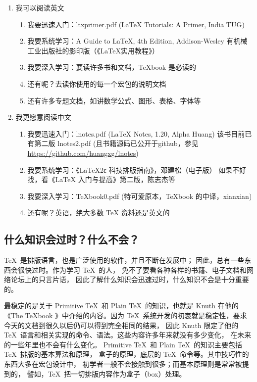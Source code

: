 \begin{enumerate}
\item 我可以阅读英文

\begin{enumerate}
\item 我要迅速入门：ltxprimer.pdf (LaTeX Tutorials: A Primer, India TUG)
\item 我要系统学习：A Guide to LaTeX, 4th Edition, Addison-Wesley
      有机械工业出版社的影印版（《LaTeX实用教程》）
\item 我要深入学习：要读许多书和文档，TeXbook 是必读的
\item 还有呢？去读你使用的每一个宏包的说明文档
\item 还有许多专题文档，如讲数学公式、图形、表格、字体等
\end{enumerate}

\item 我更愿意阅读中文
\begin{enumerate}
\item 我要迅速入门：lnotes.pdf (LaTeX Notes, 1.20, Alpha Huang)
 该书目前已有第二版 lnotes2.pdf (且书籍源码已公开于github，参见\url{https://github.com/huangxg/lnotes})
\item 我要系统学习：《LaTeX2ε 科技排版指南》，邓建松（电子版）
 如果不好找，看《LaTeX 入门与提高》第二版，陈志杰等
\item 我要深入学习：TeXbook0.pdf (特可爱原本，TeXbook 的中译，xianxian)
\item 还有呢？英语，绝大多数 TeX 资料还是英文的
\end{enumerate}
\end{enumerate}

\subsection{什么知识会过时？什么不会？}

\TeX\ 是排版语言，也是广泛使用的软件，并且不断在发展中；
因此，总有一些东西会很快过时。作为学习 \TeX\ 的人，
免不了要看各种各样的书籍、电子文档和网络论坛上的只言片语，
因此了解什么知识会迅速过时，什么知识不会是十分重要的。

最稳定的是关于 Primitive \TeX\ 和 Plain \TeX\ 的知识，也就是 Knuth
在他的《The TeXbook 》中介绍的内容。因为 \TeX\
系统开发的初衷就是稳定性，要求今天的文档到很久以后仍可以得到完全相同的结果，
因此 Knuth 限定了他的 \TeX\ 语言和相关实现的命令、语法。这些内容许多年来就没有多少变化，
在未来的一些年里也不会有什么变化。
Primitive \TeX\ 和 Plain \TeX\ 的知识主要包括 \TeX\ 排版的基本算法和原理，
盒子的原理，底层的 \TeX\ 命令等。其中技巧性的东西大多在宏包设计中，
初学者一般不会接触到很多；而基本原理则是常常被提到的，
譬如，\TeX\ 把一切排版内容作为盒子（box）处理。

